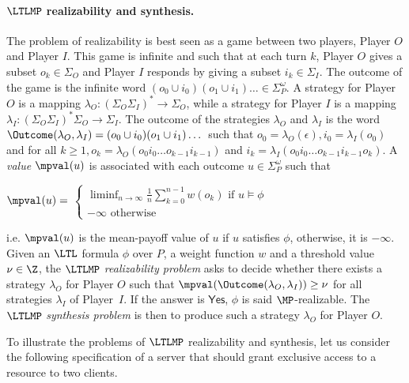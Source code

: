 \paragraph{$\LTLMP$ realizability and synthesis.} The problem of \LTLMP realizability is best seen as a game between two players, Player $O$ and Player $I$. This game is infinite and such that at each turn $k$, Player $O$ gives a subset $o_k \in \Sigma_O$ and Player $I$ responds by giving a subset $i_k \in \Sigma_I$. The outcome of the game is the infinite word $(o_0 \cup i_0)(o_1 \cup i_1)\dots \in \Sigma_P^\omega$. A strategy for Player $O$ is a mapping $\lambda_O : (\Sigma_O\Sigma_I)^* \rightarrow \Sigma_O$, while a strategy for Player $I$ is a mapping $\lambda_I : (\Sigma_O\Sigma_I)^*\Sigma_O \rightarrow \Sigma_I$. The outcome of the strategies $\lambda_O$ and $\lambda_I$ is the word $\Outcome(\lambda_O, \lambda_I) = (o_0 \cup i_0)(o_1 \cup i_1)\dots$ such that $o_0 = \lambda_O(\epsilon), i_0 = \lambda_I(o_0)$ and for all $k \geq 1, o_k = \lambda_O(o_0i_0\dots o_{k-1}i_{k-1})$ and $i_k = \lambda_I(o_0i_0\dots o_{k-1}i_{k-1}o_k)$. A \textit{value} $\mpval(u)$ is associated with each outcome $u \in \Sigma_P^\omega$ such that
\begin{center}
$\mpval(u) =$
$\begin{cases} \liminf_{n \rightarrow \infty} \frac{1}{n} \sum_{k=0}^{n-1} w(o_k) \text{ if } u \models \phi\\  - \infty \text{ otherwise} \end{cases}$
\end{center}
i.e. $\mpval(u)$ is the mean-payoff value of $u$ if $u$ satisfies $\phi$, otherwise, it is $-\infty$. Given an $\LTL$ formula $\phi$ over $P$, a weight function $w$ and a threshold value $\nu \in \Z$, the $\LTLMP$ \textit{realizability problem} asks to decide whether there exists a strategy $\lambda_O$ for Player $O$ such that $\mpval(\Outcome(\lambda_O, \lambda_I)) \geq \nu$ for all strategies $\lambda_I$ of Player~$I$. If the answer is $\mathsf{Yes}$, $\phi$ is said $\MP$-realizable. The $\LTLMP$ \textit{synthesis problem} is then to produce such a strategy $\lambda_O$ for Player $O$. 

To illustrate the problems of $\LTLMP$ realizability and synthesis, let us consider the following specification of a server that should grant exclusive access to a resource to two clients.

